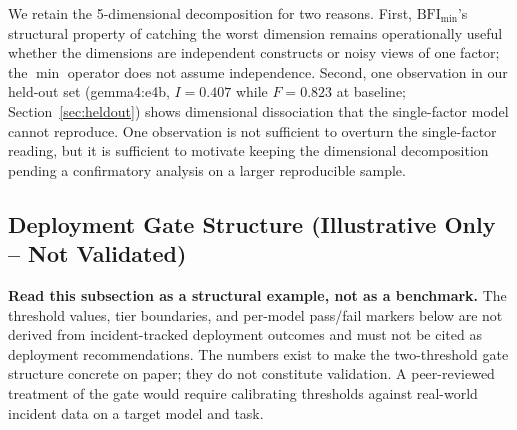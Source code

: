 \documentclass[11pt,a4paper]{article}
\begin{document}
We retain the 5-dimensional decomposition for two reasons. First, $\text{BFI}_{\min}$'s structural property of catching the worst dimension remains operationally useful whether the dimensions are independent constructs or noisy views of one factor; the $\min$ operator does not assume independence. Second, one observation in our held-out set (gemma4:e4b, $I = 0.407$ while $F = 0.823$ at baseline; Section~\ref{sec:heldout}) shows dimensional dissociation that the single-factor model cannot reproduce. One observation is not sufficient to overturn the single-factor reading, but it is sufficient to motivate keeping the dimensional decomposition pending a confirmatory analysis on a larger reproducible sample.

\subsection{Deployment Gate Structure (Illustrative Only -- Not Validated)}
\label{sec:gate}

\textbf{Read this subsection as a structural example, not as a benchmark.} The threshold values, tier boundaries, and per-model pass/fail markers below are not derived from incident-tracked deployment outcomes and must not be cited as deployment recommendations. The numbers exist to make the two-threshold gate structure concrete on paper; they do not constitute validation. A peer-reviewed treatment of the gate would require calibrating thresholds against real-world incident data on a target model and task.
\end{document}
